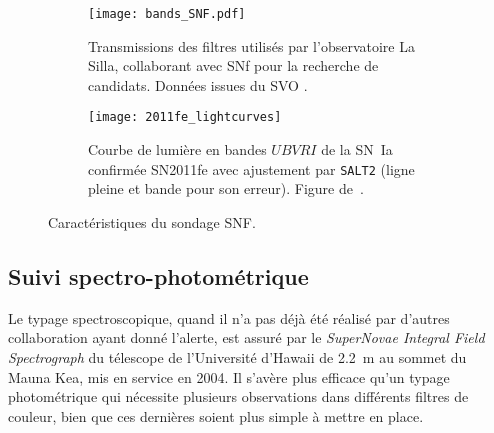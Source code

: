 \documentclass[../main/main.tex]{subfiles}
\begin{document}

\begin{figure}[ht]
    \centering
    \begin{subfigure}[]{.44\linewidth}
        \centering
        \texttt{[image: bands\_SNF.pdf]}
        \caption{Transmissions des filtres utilisés par l'observatoire La Silla,
        collaborant avec SNf pour la recherche de candidats. Données issues du
    SVO \citep{rodrigo2020}.}
        \label{fig:snfbands}
    \end{subfigure}
    \hfill
    \begin{subfigure}[]{.54\linewidth}
        \centering
        \texttt{[image: 2011fe\_lightcurves]}
        \caption{Courbe de lumière en bandes $UBVRI$ de la SN~Ia confirmée
            SN2011fe avec ajustement par \texttt{SALT2} (ligne pleine et bande
        pour son erreur). Figure de~\cite{pereira2013}.}
        \label{fig:snflc}
    \end{subfigure}
    \caption{Caractéristiques du sondage SNF.}
\end{figure}

\subsection{Suivi spectro-photométrique}\label{ssec:snfspectro}

Le typage spectroscopique, quand il n'a pas déjà été réalisé par d'autres
collaboration ayant donné l'alerte, est assuré par le \textit{SuperNovae
Integral Field Spectrograph} \citep[SNIFS,][]{lantz2004} du télescope de
l'Université d'Hawaii de \SI{2,2}{m} au sommet du Mauna Kea, mis en service en
2004. Il s'avère plus efficace qu'un typage photométrique qui nécessite
plusieurs observations dans différents filtres de couleur, bien que ces
dernières soient plus simple à mettre en place.
\end{document}
